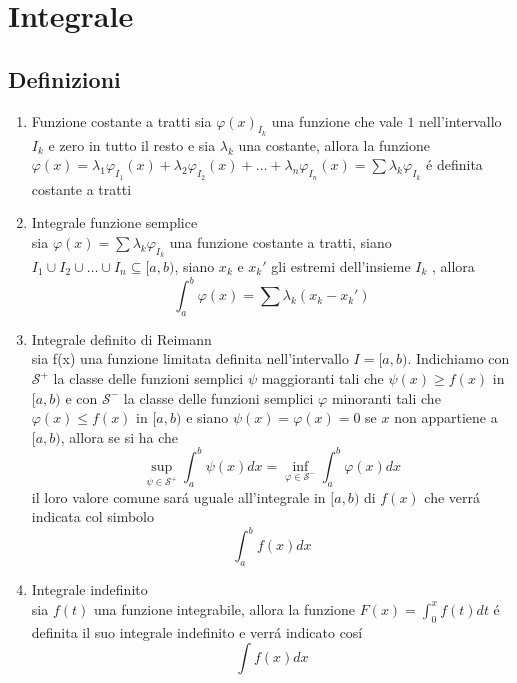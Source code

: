 \documentclass{exam}
\begin{document}
\section{Integrale}
	\subsection{Definizioni}
		\begin{enumerate}
			\item{Funzione costante a tratti}
				sia $\varphi(x)_{I_{k}}$ una funzione che vale $1$ nell'intervallo $I_{k}$ e zero in tutto il resto e sia $\lambda_{k}$ una costante, allora la funzione $\varphi(x)=\lambda_{1}\varphi_{I_{1}}(x)+\lambda_{2}\varphi_{I_{2}}(x)+\dots+\lambda_{n}\varphi_{I_{n}}(x)=\sum\lambda_{k}\varphi_{I_{k}}$ \'e definita costante a tratti
			\item{Integrale funzione semplice}\\
				sia $\varphi(x)=\sum\lambda_{k}\varphi_{I_{k}}$ una funzione costante a tratti, siano $I_1 \cup I_2 \cup \dots \cup I_n \subseteq [a,b)$,  siano $x_{k}$ e $x_{k}'$ gli estremi dell'insieme $I_{k}$ , allora 
				\begin{equation}
					\int_a^b \varphi(x)=\sum \lambda_{k}(x_{k}-x_{k}')
				\end{equation}
			\item{Integrale definito di Reimann}\\
				sia f(x) una funzione limitata definita nell'intervallo $I=[a,b)$. Indichiamo con $\mathscr{S}^+$ la classe delle funzioni semplici $\psi$ maggioranti tali che $\psi(x)\geq f(x)$ in $[a,b)$ e con $\mathscr{S}^-$ la classe delle funzioni semplici $\varphi$ minoranti tali che $\varphi(x)\le f(x)$ in $[a,b)$ e siano $\psi(x)=\varphi(x)=0$ se $x$ non appartiene a $[a,b)$, allora se si ha che 
				\begin{equation}
					\sup_{\psi\in\mathscr{S}^+}\int_a^b \psi(x)dx=\inf_{\varphi\in\mathscr{S}^-}\int_a^b \varphi(x)dx
				\end{equation}
				il loro valore comune sar\'a uguale all'integrale in $[a,b)$ di $f(x)$ che verr\'a indicata col simbolo
				\begin{equation}
					\int_a^b f(x)dx
				\end{equation}
			\item{Integrale indefinito}\\
				sia $f(t)$ una funzione integrabile, allora la funzione \(\displaystyle F(x)=\int_0^x f(t)dt\) \'e definita il suo integrale indefinito e verr\'a indicato cos\'i
				\begin{equation}
					\int f(x)dx
				\end{equation}
		\end{enumerate}
			
\end{document}
